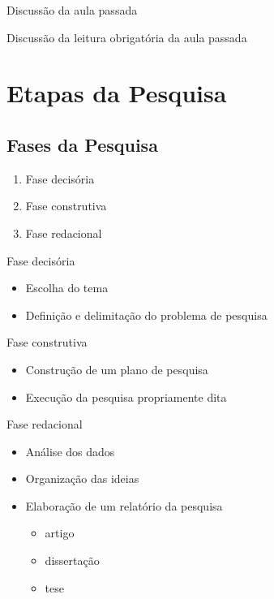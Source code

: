 \documentclass{beamer}
\begin{document}

\begin{frame}{Discussão da aula passada}
  \begin{block}{}
    Discussão da leitura obrigatória da aula passada
  \end{block}
\end{frame}

\section{Etapas da Pesquisa}

\subsection{Fases da Pesquisa}

\begin{frame}
  \begin{enumerate}
  \item Fase decisória
    \bigskip
  \item Fase construtiva
    \bigskip
  \item Fase redacional
  \end{enumerate}
\end{frame}

\begin{frame}{Fase decisória}
  \begin{itemize}
  \item Escolha do tema
    \bigskip
  \item Definição e delimitação do problema de pesquisa
  \end{itemize}
\end{frame}

\begin{frame}{Fase construtiva}
  \begin{itemize}
  \item Construção de um plano de pesquisa
    \bigskip
  \item Execução da pesquisa propriamente dita
  \end{itemize}
\end{frame}

\begin{frame}{Fase redacional}
  \begin{itemize}
  \item Análise dos dados
    \bigskip
  \item Organização das ideias
    \bigskip
  \item Elaboração de um relatório da pesquisa
    \begin{itemize}
    \item artigo
    \item dissertação
    \item tese
    \end{itemize}
  \end{itemize}
\end{frame}
\end{document}
